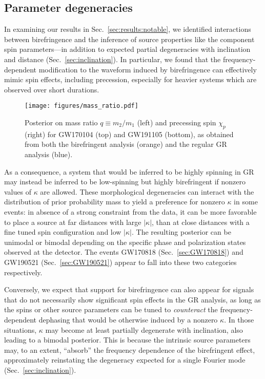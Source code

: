 \documentclass[aps,prd,twocolumn,superscriptaddress,preprintnumbers,nofootinbib]{revtex4-2}
\begin{document}
\subsection{Parameter degeneracies}
\label{sec:degeneracies}

In examining our results in Sec.~\ref{sec:results:notable}, we identified interactions between birefringence and the inference of source properties like the component spin parameters---in addition to expected partial degeneracies with inclination and distance (Sec.~\ref{sec:inclination}).
In particular, we found that the frequency-dependent modification to the waveform induced by birefringence can effectively mimic spin effects, including precession, especially for heavier systems which are observed over short durations.

\begin{figure}
    \texttt{[image: figures/mass\_ratio.pdf]}
    \caption{
    Posterior on mass ratio $q \equiv m_2/m_1$ (left) and precessing spin $\chi_p$ (right) for GW170104 (top) and GW191105 (bottom), as obtained from both the birefringent analysis (orange) and the regular \ac{GR} analysis (blue).
    }
    \label{fig:mass_ratio}
\end{figure}

As a consequence, a system that would be inferred to be highly spinning in \ac{GR} may instead be inferred to be low-spinning but highly birefringent if nonzero values of $\kappa$ are allowed.
These morphological degeneracies can interact with the distribution of prior probability mass to yield a preference for nonzero $\kappa$ in some events: in absence of a strong constraint from the data, it can be more favorable to place a source at far distances with large $|\kappa|$, than at close distances with a fine tuned spin configuration and low $|\kappa|$.
The resulting posterior can be unimodal or bimodal depending on the specific phase and polarization states observed at the detector.
The events GW170818 (Sec.~\ref{sec:GW170818}) and GW190521 (Sec.~\ref{sec:GW190521}) appear to fall into these two categories respectively.

Conversely, we expect that support for birefringence can also appear for signals that do not necessarily show significant spin effects in the \ac{GR} analysis, as long as the spins or other source parameters can be tuned to \emph{counteract} the frequency-dependent dephasing that would be otherwise induced by a nonzero $\kappa$.
In those situations, $\kappa$ may become at least partially degenerate with inclination, also leading to a bimodal posterior.
This is because the intrinsic source parameters may, to an extent, ``absorb'' the frequency dependence of the birefringent effect, approximately reinstating the degeneracy expected for a single Fourier mode (Sec.~\ref{sec:inclination}).
\end{document}
